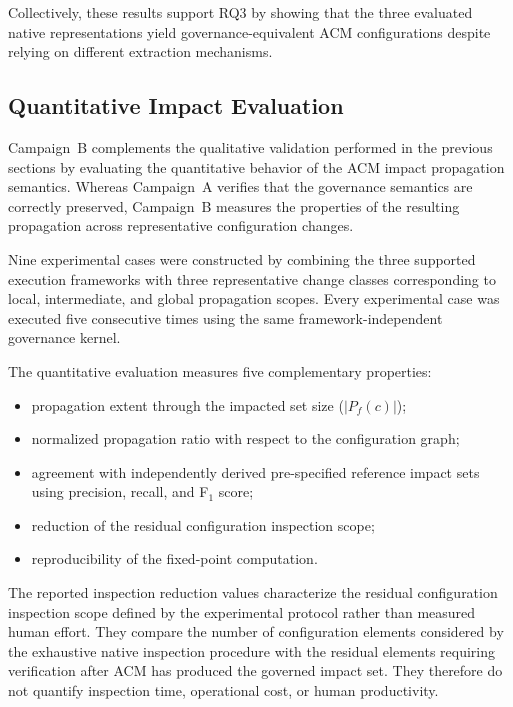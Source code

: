 \documentclass[10pt]{article}
\begin{document}
Collectively, these results support RQ3 by showing that the three evaluated native representations yield governance-equivalent ACM configurations despite relying on different extraction mechanisms.

\subsection{Quantitative Impact Evaluation}
\label{sec:quantitative_impact}

Campaign~B complements the qualitative validation performed in the previous sections by evaluating the quantitative behavior of the ACM impact propagation semantics. Whereas Campaign~A verifies that the governance semantics are correctly preserved, Campaign~B measures the properties of the resulting propagation across representative configuration changes.

Nine experimental cases were constructed by combining the three supported execution frameworks with three representative change classes corresponding to local, intermediate, and global propagation scopes. Every experimental case was executed five consecutive times using the same framework-independent governance kernel.

The quantitative evaluation measures five complementary properties:

\begin{itemize}
	\item propagation extent through the impacted set size ($|P_f(c)|$);
	\item normalized propagation ratio with respect to the configuration graph;
	\item agreement with independently derived pre-specified reference impact sets using precision, recall, and F$_1$ score;
	\item reduction of the residual configuration inspection scope;
	\item reproducibility of the fixed-point computation.
\end{itemize}

The reported inspection reduction values characterize the residual configuration inspection scope defined by the experimental protocol rather than measured human effort. They compare the number of configuration elements considered by the exhaustive native inspection procedure with the residual elements requiring verification after ACM has produced the governed impact set. They therefore do not quantify inspection time, operational cost, or human productivity.
\end{document}
